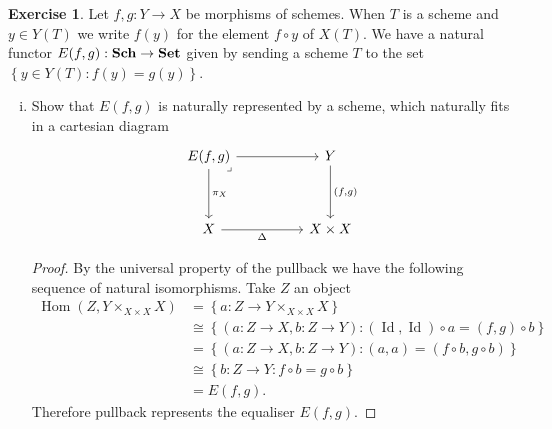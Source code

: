 \documentclass{article}
\DeclareMathOperator{\Id}{Id}
\DeclareMathOperator{\Hom}{Hom}
\newcommand{\schemes}{{\bf Sch}}
\newcommand{\catset}{{\bf Set}}
\newcommand{\set}[1]{\left\{#1\right\}}
\newcommand{\setwith}[2]{\left\{#1:#2\right\}}
\theoremstyle{definition}
\newtheorem{question}{Exercise}
\begin{document}
\begin{question}
    Let \(f,g:Y\to X\) be morphisms of schemes. When \(T\) is a scheme and
    \(y\in Y(T)\) we write \(f(y)\) for the element \(f\circ y\) of \(X(T)\). We
    have a natural functor \(E(f,g):\schemes\to\catset\) given by sending a
    scheme \(T\) to the set \(\setwith{y\in Y(T)}{f(y)=g(y)}\).

    \begin{enumerate}[(i)]
        \item Show that \(E(f,g)\) is naturally represented by a scheme, which
              naturally fits in a cartesian diagram
              \[
                  \begin{tikzcd}[ampersand replacement=\&]
                      {E(f,g)} \&\& Y \\
                      \\
                      X \&\& {X\times X}
                      \arrow[from=1-1, to=1-3]
                      \arrow["{(f,g)}", from=1-3, to=3-3]
                      \arrow["\Delta"', from=3-1, to=3-3]
                      \arrow["\pi_{X}", from=1-1, to=3-1]
                      \arrow["\lrcorner"{anchor=center, pos=0}, draw=none, from=1-1, to=3-3]
                  \end{tikzcd}
              \]

              \begin{proof}
                  By the universal property of the pullback we have the
                  following sequence of natural isomorphisms. Take \(Z\) an object
                  \begin{align*}
                      \Hom(Z,Y\times_{X\times X}X) & =\set{a:Z\to Y\times_{X\times X}X}                                \\
                                                   & \cong\setwith{(a:Z\to X,b:Z\to Y)}{(\Id,\Id)\circ a=(f,g)\circ b} \\
                                                   & =\setwith{(a:Z\to X,b:Z\to Y)}{(a,a)=(f\circ b,g\circ b)}         \\
                                                   & \cong\setwith{b:Z\to Y}{f\circ b=g\circ b}                        \\
                                                   & =E(f,g).
                  \end{align*}
                  Therefore pullback represents the equaliser \(E(f,g)\).
              \end{proof}


\end{enumerate}
\end{question}
\end{document}
